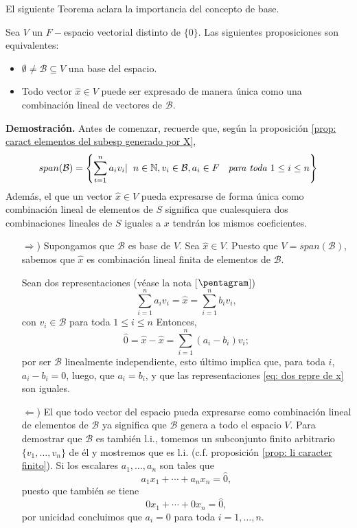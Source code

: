 El siguiente Teorema aclara la importancia del concepto de base.
\begin{teo}
	\label{teo: equiv de base}
Sea $V$ un $F-$espacio vectorial distinto de $\{ 0 \}$.
Las siguientes proposiciones son equivalentes:
\begin{itemize}
	\item $\emptyset \neq \mathcal{B} \subseteq V$ una base del espacio.
	\item Todo vector $\hat{x} \in V$ puede ser expresado de manera
	única como una combinación lineal de vectores de $\mathcal{B}$.
\end{itemize} 
\end{teo}
\noindent
\textbf{Demostración.}
Antes de comenzar, recuerde que, según la proposición
\ref{prop: caract elementos del subesp generado por X},
\[
span(\mathcal{B})
= 
\left\{ \sum_{i=1}^{n} a_{i}v_{i} | \hspace{0.2cm} 
n \in \mathbb{N}, v_{i} \in \mathcal{B}, 
a_{i} \in F \hspace{0.2cm} \textit{ para toda }
1 \leq i \leq n \right\}
\]
Además, el que
un vector $\hat{x} \in V$ pueda expresarse de forma única
como combinación lineal de elementos de
$S$ significa que cualesquiera dos combinaciones
lineales de $S$ iguales a $x$ tendrán los mismos coeficientes.
\begin{itemize}
	\item[$\Rightarrow$)] Supongamos que $\mathcal{B}$ es base de $V$.
	Sea $\hat{x} \in V$. Puesto que $V = span(\mathcal{B})$,
	sabemos que $\hat{x}$ es combinación lineal 
	finita de elementos de $\mathcal{B}$.
	
	Sean dos representaciones (véase la nota [$\pentagram$])
	\begin{equation}
		\label{eq: dos repre de x}
		\sum_{i=1}^{n} a_{i} v_{i} = \hat{x} = 
	\sum_{i=1}^{n} b_{i} v_{i},
	\end{equation}
	con $v_{i} \in \mathcal{B}$ para toda $1 \leq i \leq n$
	Entonces,
	\[
	\hat{0} = \hat{x} - \hat{x} = 
	\sum_{i=1}^{n} (a_{i} - b_{i}) v_{i};
	\]
	por ser $\mathcal{B}$ linealmente independiente, esto último
	implica que, para toda $i$, $a_{i} - b_{i} = 0$, luego,
	que $a_{i} = b_{i}$, y que las representaciones 
	\eqref{eq: dos repre de x} son iguales.
	
	
	\item[$\Leftarrow$)] El que todo vector del espacio pueda expresarse 
	como combinación lineal de elementos de $\mathcal{B}$ ya
	significa que $\mathcal{B}$ genera a todo el espacio $V$.
	Para demostrar que $\mathcal{B}$ es también l.i., tomemos
	un subconjunto finito arbitrario
	$\{ v_{1}, \ldots , v_{n} \}$ de él y mostremos que es 
	l.i. (c.f. proposición \ref{prop: li caracter finito}).
	Si los escalares $a_{1}, \ldots , a_{n}$ son tales que
	\[
	a_{1} x_{1} + \cdots + a_{n} x_{n} = \hat{0},
	\]
	puesto que también se tiene
	\[
	0 x_{1} + \cdots + 0 x_{n} = \hat{0},
	\]
	por unicidad concluimos que
	$a_{i} = 0$ para toda $i = 1, \ldots , n$. 
	 
\end{itemize}
\QEDB
\vspace{0.2cm}


